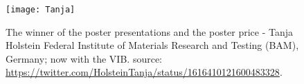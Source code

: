 \begin{figure}[ht]
\centering
\texttt{[image: Tanja]}
\caption{The winner of the poster presentations and the poster price - Tanja Holstein Federal Institute of Materials Research and Testing (BAM), Germany; now with the VIB. source: \url{https://twitter.com/HolsteinTanja/status/1616410121600483328}.}
\label{fig:poster}
\end{figure}
